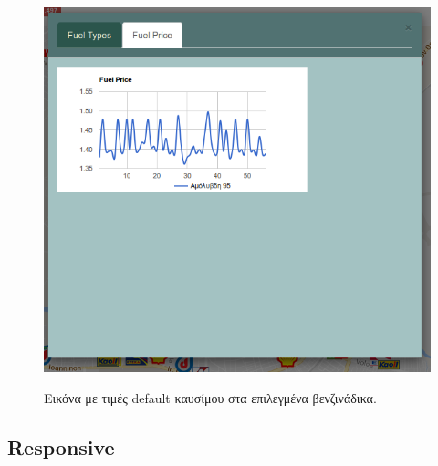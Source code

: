 \begin{figure}[H]
  \caption{Εικόνα με τιμές default καυσίμου στα επιλεγμένα βενζινάδικα.}
  \centering
    \includegraphics[width=1\textwidth]{img/chart2.png}
    \label{fig:chart2}
\end{figure}

\subsection{Responsive}

